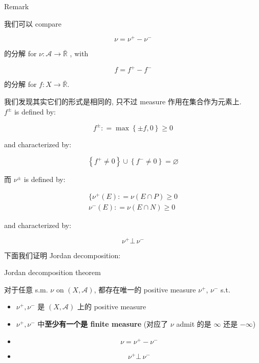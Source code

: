 \documentclass{qlnotes-export}
\begin{document}
\begin{qlremark}{Remark}

我们可以 compare

\[\nu = \nu^{+} - \nu^{-}\]

的分解 for \(\nu:\mathcal{A}\rightarrow\bar{\mathbb{R}}\) , with

\[f = f^{+} - f^{-}\]

的分解 for \(f:X\rightarrow\bar{\mathbb{R}}\).

我们发现其实它们的形式是相同的, 只不过 measure 作用在集合作为元素上.\\
\(f^{\pm}\) is defined by:

\[f^{\pm}: = \max\left\{ {\pm f,0} \right\} \geq 0\]

and characterized by:

\[\left\{ {f^{+} \neq 0} \right\} \cup \left\{ {f^{-} \neq 0} \right\} = \varnothing\]

而 \(\nu^{\pm}\) is defined by:

\[\begin{matrix}
{\{\nu^{+}(E): = \nu(E \cap P) \geq 0} \\
{\nu^{-}(E): = \nu(E \cap N) \geq 0}
\end{matrix}\]

and characterized by:

\[\nu^{+}\bot\,\nu^{-}\]

\end{qlremark}

下面我们证明 Jordan decomposition:

\begin{theorem}{Jordan decomposition theorem}\label{thm-10-signed-measure-jordan-decomposition-jordan-decomposition-theorem}

对于任意 s.m. \(\nu\) on \((X,\mathcal{A})\), 都存在唯一的 positive measure \(\nu^{+}\), \(\nu^{-}\) s.t.

\begin{itemize}
\item
  \(\nu^{+},\nu^{-}\) 是 \((X,\mathcal{A})\) 上的 positive measure
\item
  \(\nu^{+},\nu^{-}\) 中\textbf{至少有一个是 finite measure} (对应了 \(\nu\) admit 的是 \(\infty\) 还是 \(- \infty\))
\item
  \[\nu = \nu^{+} - \nu^{-}\]
\item
  \[\nu^{+}\bot\,\nu^{-}\]
\end{itemize}

\end{theorem}
\end{document}
